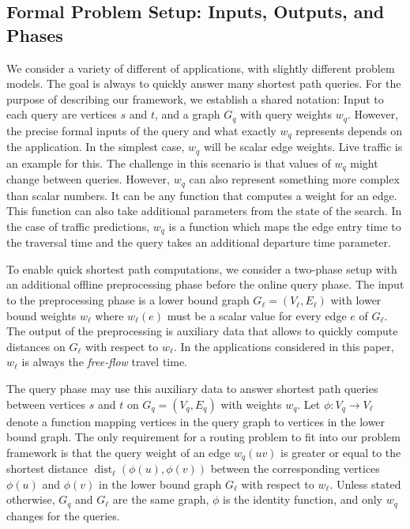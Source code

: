 \documentclass[manuscript,review]{acmart}
\newcommand*{\dist}{\operatorname{dist}}
\begin{document}
\subsection{Formal Problem Setup: Inputs, Outputs, and Phases}\label{sec:formal_framework}

We consider a variety of different of applications, with slightly different problem models.
The goal is always to quickly answer many shortest path queries.
For the purpose of describing our framework, we establish a shared notation:
Input to each query are vertices $s$ and $t$, and a graph $G_q$ with query weights $w_q$.
However, the precise formal inputs of the query and what exactly $w_q$ represents depends on the application.
In the simplest case, $w_q$ will be scalar edge weights.
Live traffic is an example for this.
The challenge in this scenario is that values of $w_q$ might change between queries.
However, $w_q$ can also represent something more complex than scalar numbers.
It can be any function that computes a weight for an edge.
This function can also take additional parameters from the state of the search.
In the case of traffic predictions, $w_q$ is a function which maps the edge entry time to the traversal time and the query takes an additional departure time parameter.

To enable quick shortest path computations, we consider a two-phase setup with an additional offline preprocessing phase before the online query phase.
The input to the preprocessing phase is a lower bound graph $G_\ell = (V_{\ell}, E_{\ell})$ with lower bound weights $w_\ell$ where $w_\ell(e)$ must be a scalar value for every edge $e$ of $G_\ell$.
The output of the preprocessing is auxiliary data that allows to quickly compute distances on $G_\ell$ with respect to $w_\ell$.
In the applications considered in this paper, $w_\ell$ is always the \emph{free-flow} travel time.

The query phase may use this auxiliary data to answer shortest path queries between vertices $s$ and $t$ on $G_q = (V_q, E_q)$ with weights $w_q$.
Let $\phi : V_q \to V_{\ell}$ denote a function mapping vertices in the query graph to vertices in the lower bound graph.
The only requirement for a routing problem to fit into our problem framework is that the query weight of an edge $w_q(u v)$ is greater or equal to the shortest distance $\dist_\ell(\phi(u), \phi(v))$ between the corresponding vertices $\phi(u)$ and $\phi(v)$ in the lower bound graph $G_\ell$ with respect to $w_\ell$.
Unless stated otherwise, $G_q$ and $G_\ell$ are the same graph, $\phi$ is the identity function, and only $w_q$ changes for the queries.
\end{document}
